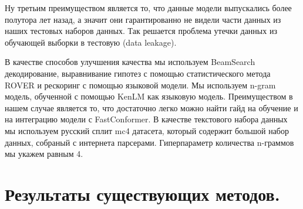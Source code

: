 Ну третьим преимуществом является то, что данные модели выпускались более полутора лет назад, а значит они гарантированно не видели части данных из наших тестовых наборов данных.
Так решается проблема утечки данных из обучающей выборки в тестовую (data leakage).

В качестве способов улучшения качества мы используем BeamSearch декодирование, выравнивание гипотез с помощью статистического метода ROVER и рескоринг с помощью языковой модели.
Мы используем n-gram модель, обученной с помощью KenLM как языковую модель.
Преимуществом в нашем случае является то, что достаточно легко можно найти гайд на обучение и на интеграцию модели с FastConformer.
В качестве текстового набора данных мы используем русский сплит mc4 датасета, который содержит большой набор данных, собраный с интернета парсерами.
Гиперпараметр количества n-граммов мы укажем равным 4.

\section{Результаты существующих методов.}

